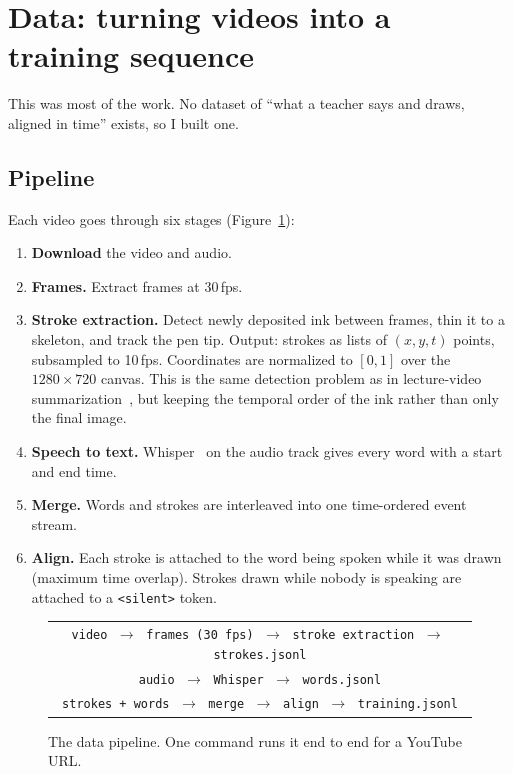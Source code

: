 \documentclass[11pt]{article}
\newcommand{\cond}[1]{\texttt{#1}}
\begin{document}
\section{Data: turning videos into a training sequence}
\label{sec:data}

This was most of the work. No dataset of ``what a teacher says and draws, aligned in time'' exists, so I built one.

\subsection{Pipeline}

Each video goes through six stages (Figure~\ref{fig:pipeline}):

\begin{enumerate}[leftmargin=*,itemsep=2pt]
\item \textbf{Download} the video and audio.
\item \textbf{Frames.} Extract frames at 30\,fps.
\item \textbf{Stroke extraction.} Detect newly deposited ink between frames, thin it to a skeleton, and track the pen tip. Output: strokes as lists of $(x, y, t)$ points, subsampled to 10\,fps. Coordinates are normalized to $[0,1]$ over the $1280 \times 720$ canvas. This is the same detection problem as in lecture-video summarization~\citep{davila2017whiteboard,kota2019lecture}, but keeping the temporal order of the ink rather than only the final image.
\item \textbf{Speech to text.} Whisper~\citep{radford2023whisper} on the audio track gives every word with a start and end time.
\item \textbf{Merge.} Words and strokes are interleaved into one time-ordered event stream.
\item \textbf{Align.} Each stroke is attached to the word being spoken while it was drawn (maximum time overlap). Strokes drawn while nobody is speaking are attached to a \cond{<silent>} token.
\end{enumerate}

\begin{figure}[ht!]
\centering
\small
\begin{tabular}{c}
\texttt{video} $\;\rightarrow\;$ \texttt{frames (30 fps)} $\;\rightarrow\;$ \texttt{stroke extraction} $\;\rightarrow\;$ \texttt{strokes.jsonl} \\[4pt]
\texttt{audio} $\;\rightarrow\;$ \texttt{Whisper} $\;\rightarrow\;$ \texttt{words.jsonl} \\[4pt]
\texttt{strokes + words} $\;\rightarrow\;$ \texttt{merge} $\;\rightarrow\;$ \texttt{align} $\;\rightarrow\;$ \texttt{training.jsonl}
\end{tabular}
\caption{The data pipeline. One command runs it end to end for a YouTube URL.}
\label{fig:pipeline}
\end{figure}
\end{document}
